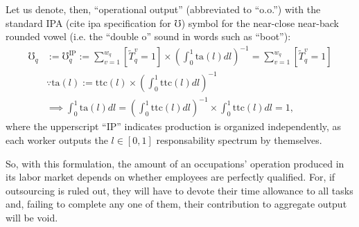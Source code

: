 \documentclass[hidelinks, nonatbib]{elsarticle}
\begin{document}
\begin{axiom}
    \begin{subaxiom}
        Let us denote, then, ``operational output'' (abbreviated to ``o.o.'') with the standard IPA (cite ipa specification for $\mho$) symbol for the near-close near-back rounded vowel (i.e. the ``double o'' sound in words such as ``boot''):
        \begin{align}
            \mho_q
            &
            :=
            \mho_{q}^{\text{IP}}
            :=
            \sum_{v=1}^{w_q}{
                \left[
                    \tilde{T}_{q}^{v}
                    =
                    1
                \right]
                \times
                \left(
                    \int_{0}^{1}{
                        \text{ta}(l)
                        dl
                    }
                \right) ^ {-1}
            }
            =
            \sum_{v=1}^{w_q}{
                \left[
                    \tilde{T}_{q}^{v}
                    =
                    1
                \right]
            }
            \\
            &\because
            \text{ta}(l) 
            :=
            \text{ttc}(l)
            \times
            \left(
                \int_{0}^{1}{
                    \text{ttc}(l)
                    dl
                }
            \right) ^ {-1}
            \\
            &
            \implies
            \int_{0}^{1}{
                \text{ta}(l)
                dl
            }
            =
            \left(
                \int_{0}^{1}
                \text{ttc}(l)
                dl
            \right) ^ {-1}
            \times
            \int_{0}^{1}{
                \text{ttc}(l)
                dl
            }
            =
            1
            ,
        \end{align}
        where the upperscript ``IP'' indicates production is organized independently, as each worker outputs the $l \in [0,1]$ responsability spectrum by themselves.
        
        So, with this formulation, the amount of an occupations' operation produced in its labor market depends on whether employees are perfectly qualified. For, if outsourcing is ruled out, they will have to devote their time allowance to all tasks and, failing to complete any one of them, their contribution to aggregate output will be void.


\end{subaxiom}
\end{axiom}
\end{document}

